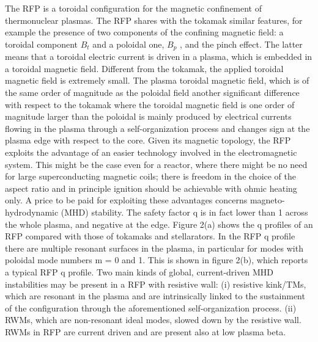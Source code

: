 The RFP is a toroidal configuration for the magnetic confinement of thermonuclear plasmas. The RFP shares with the tokamak similar features, for example the presence of two components of the confining magnetic field: a toroidal component $B_t$ and a poloidal one, $B_p$ , and the pinch effect. The latter means that a toroidal electric current is driven in a plasma, which is embedded in a toroidal magnetic field. Different from the tokamak, the applied toroidal magnetic field is extremely small. The plasma toroidal magnetic field, which is of the same order of magnitude as the poloidal field another significant difference with respect to the tokamak where the toroidal magnetic field is one order of magnitude larger than the poloidal is mainly produced by electrical currents flowing in the plasma through a self-organization process and changes sign at the plasma edge with respect to the core. Given its magnetic topology, the RFP exploits the advantage of an easier technology involved in the electromagnetic system. This might be the case even for a reactor, where there might be no need for large superconducting magnetic coils; there is freedom in the choice of the aspect ratio and in principle ignition should be achievable with ohmic heating only. 
A price to be paid for exploiting these advantages concerns magneto-hydrodynamic (MHD) stability. The safety factor q is in fact lower than 1 across the whole plasma, and negative at the edge. Figure 2(a) shows the q profiles of an RFP compared with those of tokamaks and stellarators. In the RFP q profile there are multiple resonant surfaces in the plasma, in particular for modes with poloidal mode numbers m = 0 and 1. This is shown in figure 2(b), which reports a typical RFP q profile. Two main kinds of global, current-driven MHD instabilities may be present in a RFP with resistive wall: (i) resistive kink/TMs, which are resonant in the plasma and are intrinsically linked to the sustainment of the configuration through the aforementioned self-organization process. (ii) RWMs, which are non-resonant ideal modes, slowed down by the resistive wall. RWMs in RFP are current driven and are present also at low plasma beta.


